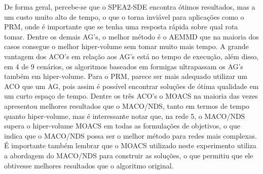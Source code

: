 De forma geral, percebe-se que o SPEA2-SDE encontra ótimos resultados, mas a um custo muito alto de tempo, o que o torna inviável para aplicações como o PRM, onde é importante que se tenha uma resposta rápida sobre qual rota tomar. Dentre os demais AG's, o melhor método é o AEMMD que na maioria dos casos consegue o melhor hiper-volume sem tomar muito mais tempo. A grande vantagem dos ACO's em relação aos AG's está no tempo de execução, além disso, em 4 de 9 cenários, os algoritmos baseados em formigas ultrapassam os AG's também em hiper-volume. Para o PRM, parece ser mais adequado utilizar um ACO que um AG, pois assim é possível encontrar soluções de ótima qualidade em um curto espaço de tempo. Dentre os três ACO's o MOACS na maioria das vezes apresentou melhores resultados que o MACO/NDS, tanto em termos de tempo quanto hiper-volume, mas é interessante notar que, na rede 5, o MACO/NDS supera o hiper-volume MOACS em todas as formulações de objetivos, o que indica que o MACO/NDS possa ser o melhor método para redes mais complexas. É importante também lembrar que o MOACS utilizado neste experimento utiliza a abordagem do MACO/NDS para construir as soluções, o que permitiu que ele obtivesse melhores resultados que o algoritmo original.